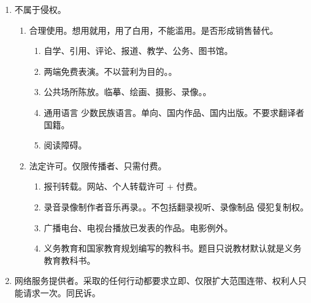 \begin{enumerate}
\begin{enumerate}
\begin{enumerate}
                \end{enumerate}
          \item 录音录像制作者。复发租网、要收钱。复制、发行、出租；信息网络传播。获得报酬。
          \item 广播电台、电视台播放。复网转录。转播、录制、复制、信息网络传播。播放后才享权。。
        \end{enumerate}
  \item 不属于侵权。
        \begin{enumerate}
          \item 合理使用。想用就用，用了白用，不能滥用。是否形成销售替代。
                \begin{enumerate}
                  \item 自学、引用、评论、报道、教学、公务、图书馆。
                  \item 两端免费表演。不以营利为目的。。
                  \item 公共场所陈放。临摹、绘画、摄影、录像。。
                  \item 通用语言 \yjt 少数民族语言。单向、国内作品、国内出版。不要求翻译者国籍。
                  \item 阅读障碍。
                \end{enumerate}
          \item 法定许可。仅限传播者、只需付费。
                \begin{enumerate}
                  \item 报刊转载。网站、个人转载许可 + 付费。
                  \item 录音录像制作者音乐再录。。不包括翻录视听、录像制品 \yjt 侵犯复制权。
                  \item 广播电台、电视台播放已发表的作品。电影例外。
                  \item 义务教育和国家教育规划编写的教科书。题目只说教材默认就是义务教育教科书。
                \end{enumerate}
        \end{enumerate}
  \item 网络服务提供者。采取的任何行动都要求立即、仅限扩大范围连带、权利人只能请求一次。同民诉。
\end{enumerate}

